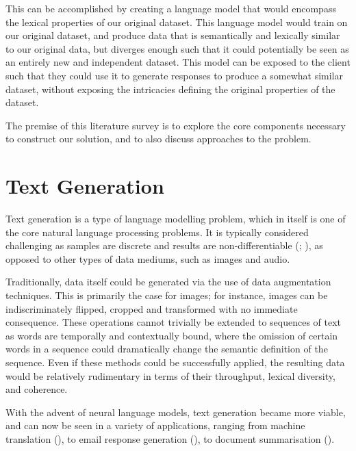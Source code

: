 \documentclass[12pt,twoside]{report}
\begin{document}
This can be accomplished by creating a language model that would encompass the lexical properties of our original dataset. This language model would train on our original dataset, and produce data that is semantically and lexically similar to our original data, but diverges enough such that it could potentially be seen as an entirely new and independent dataset. This model can be exposed to the client such that  they could use it to generate responses to produce a somewhat similar dataset, without exposing the intricacies defining the original properties of the dataset.

The premise of this literature survey is to explore the core components necessary to construct our solution, and to also discuss approaches to the problem.

\section{Text Generation}


Text generation is a type of language modelling problem, which in itself is one of the core natural language processing problems. It is typically considered challenging as samples are discrete and results are non-differentiable (\cite{kovalenko_controllable_2017}; \cite{kovalenko_controllable_2017-1}), as opposed to other types of data mediums, such as images and audio.

Traditionally, data itself could be generated via the use of data augmentation techniques. This is primarily the case for images; for instance, images can be indiscriminately flipped, cropped and transformed with no immediate consequence. These operations cannot trivially be extended to sequences of text as words are temporally and contextually bound, where the omission of certain words in a sequence could dramatically change the semantic definition of the sequence. Even if these methods could be successfully applied, the resulting data would be relatively rudimentary in terms of their throughput, lexical diversity, and coherence.

With the advent of neural language models, text generation became more viable, and can now be seen in a variety of applications, ranging from machine translation (\cite{sutskever_sequence_2014}), to email response generation (\cite{kannan_smart_2016}), to document summarisation (\cite{nallapati_summarunner_2016}).
\end{document}
